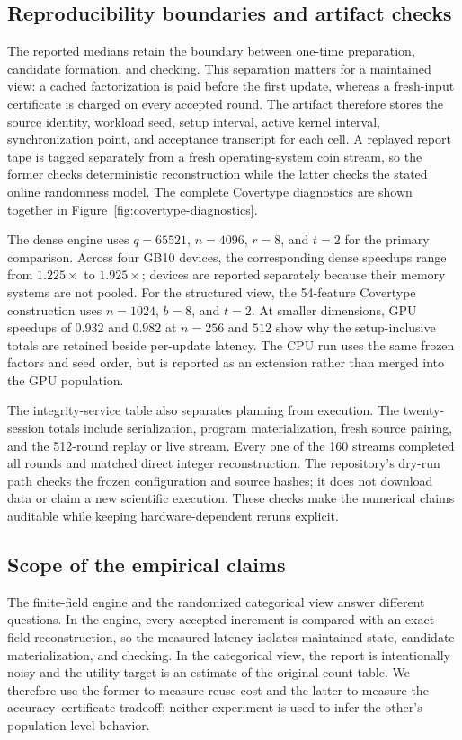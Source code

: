 \subsection{Reproducibility boundaries and artifact checks}
The reported medians retain the boundary between one-time preparation,
candidate formation, and checking. This separation matters for a maintained
view: a cached factorization is paid before the first update, whereas a
fresh-input certificate is charged on every accepted round. The artifact
therefore stores the source identity, workload seed, setup interval, active
kernel interval, synchronization point, and acceptance transcript for each
cell. A replayed report tape is tagged separately from a fresh operating-system
coin stream, so the former checks deterministic reconstruction while the
latter checks the stated online randomness model. The complete Covertype
diagnostics are shown together in Figure~\ref{fig:covertype-diagnostics}.

The dense engine uses $q=65521$, $n=4096$, $r=8$, and $t=2$ for the primary
comparison. Across four GB10 devices, the corresponding dense speedups range
from $1.225\times$ to $1.925\times$; devices are reported separately because
their memory systems are not pooled. For the structured view, the 54-feature
Covertype construction uses $n=1024$, $b=8$, and $t=2$. At smaller dimensions,
GPU speedups of $0.932$ and $0.982$ at $n=256$ and $512$ show why the
setup-inclusive totals are retained beside per-update latency. The CPU run
uses the same frozen factors and seed order, but is reported as an extension
rather than merged into the GPU population.

The integrity-service table also separates planning from execution. The
twenty-session totals include serialization, program materialization, fresh
source pairing, and the 512-round replay or live stream. Every one of the 160
streams completed all rounds and matched direct integer reconstruction. The
repository's dry-run path checks the frozen configuration and source hashes;
it does not download data or claim a new scientific execution. These checks
make the numerical claims auditable while keeping hardware-dependent reruns
explicit.

\subsection{Scope of the empirical claims}
The finite-field engine and the randomized categorical view answer different
questions. In the engine, every accepted increment is compared with an exact
field reconstruction, so the measured latency isolates maintained state,
candidate materialization, and checking. In the categorical view, the report
is intentionally noisy and the utility target is an estimate of the original
count table. We therefore use the former to measure reuse cost and the latter
to measure the accuracy--certificate tradeoff; neither experiment is used to
infer the other's population-level behavior.

